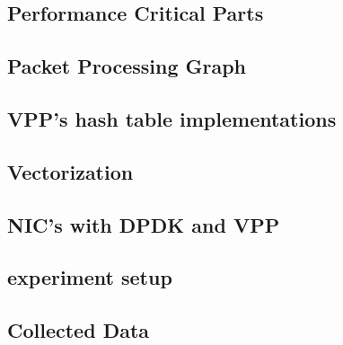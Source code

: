 \subsection{Performance Critical Parts}


\subsection{Packet Processing Graph}


 
\subsection{VPP's hash table implementations}


\subsection{Vectorization}



\subsection{NIC's with DPDK and VPP}



\subsection{experiment setup}


\subsection{Collected Data}





